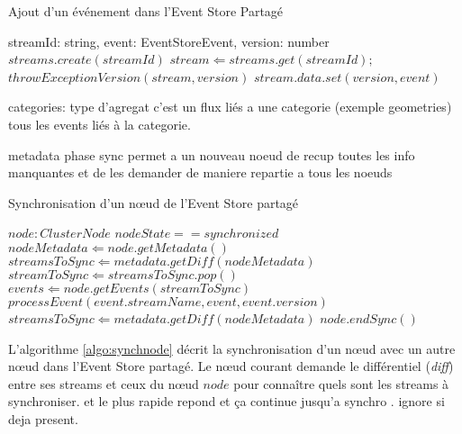\begin{algorithm} %
	\caption{Ajout d'un événement dans l'Event Store Partagé} %
	\label{algo:addevent} %
	\begin{algorithmic} %
		\REQUIRE streamId: string, event: EventStoreEvent, version: number
		\STATE$ streams.create(streamId)$
		\ENDIF
		\STATE $stream \Leftarrow streams.get(streamId);$
		\STATE $throwExceptionVersion(stream,version)$
		\ENDIF
		\STATE $stream.data.set(version,event) $
	\end{algorithmic}
\end{algorithm}


categories: type d’agregat
c’est un flux liés a une categorie (exemple geometries) tous les events liés à la 
categorie.

metadata phase sync permet a un nouveau noeud de recup toutes les info 
manquantes et de les demander de maniere repartie a tous les noeuds


\begin{algorithm} %
	\caption{Synchronisation d'un n\oe ud de l'Event Store partagé} %
	\label{algo:synchnode} %
	\begin{algorithmic} %
		\REQUIRE $node : ClusterNode$
		\ENSURE $nodeState == synchronized$
		\STATE $nodeMetadata \Leftarrow node.getMetadata()$
			\STATE $streamsToSync \Leftarrow metadata.getDiff(nodeMetadata)$
				\STATE $streamToSync \Leftarrow streamsToSync.pop()$
				\STATE $events \Leftarrow  node.getEvents(streamToSync)$
						\STATE $processEvent(event.streamName, event, 
						event.version)$
					\ENDFOR 
				\ENDIF
				\STATE $streamsToSync \Leftarrow metadata.getDiff(nodeMetadata)$
			\ENDWHILE
		\ENDIF
		\STATE $node.endSync()$
	\end{algorithmic}
\end{algorithm}

L'algorithme \ref{algo:synchnode} décrit la synchronisation d'un n\oe ud avec un 
autre n\oe ud dans l'Event Store partagé. Le n\oe ud courant demande le 
différentiel (\textit{diff}) entre ses streams et ceux du n\oe ud $node$ pour 
connaître quels sont les streams à synchroniser. 
et le plus rapide repond et ça continue jusqu’a synchro . ignore si deja present.


